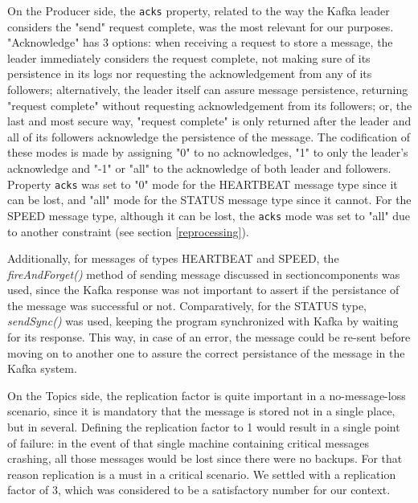 \documentclass[12pt]{article}
\begin{document}
On the Producer side, the \texttt{acks} property, related to the way the Kafka leader considers the "send" request complete, was the most relevant for our purposes. 
"Acknowledge" has 3 options: 
when receiving a request to store a message, the leader immediately considers the request complete, not making sure of its persistence in its logs nor requesting 
the acknowledgement from any of its followers; 
alternatively, the leader itself can assure message persistence, returning "request complete" without requesting acknowledgement from its followers; 
or, the last and most secure way, "request complete" is only returned after the leader and all of its followers acknowledge the persistence of the message. 
The codification of these modes is made by assigning "0" to no acknowledges, "1" to only the leader's acknowledge and "-1" or "all" to the acknowledge of both 
leader and followers. 
Property \texttt{acks} was set to "0" mode for the HEARTBEAT message type since it can be lost, and "all" mode for the STATUS message type since it cannot. 
For the SPEED message type, although it can be lost, the \texttt{acks} mode was set to "all" due to another constraint (see section \ref{reprocessing}).

Additionally, for messages of types HEARTBEAT and SPEED, the \textit{fireAndForget()} method of sending message discussed in section{components} was used, since 
the Kafka response was not important to assert if the persistance of the message was successful or not.
Comparatively, for the STATUS type, \textit{sendSync()} was used, keeping the program synchronized with Kafka by waiting for its response.
This way, in case of an error, the message could be re-sent before moving on to another one to assure the correct persistance of the message in the Kafka system.

On the Topics side, the replication factor is quite important in a no-message-loss scenario, since it is mandatory that the message is stored not in a single 
place, but in several.
Defining the replication factor to 1 would result in a single point of failure: in the event of that single machine containing critical messages crashing, all 
those messages would be lost since there were no backups. 
For that reason replication is a must in a critical scenario. 
We settled with a replication factor of 3, which was considered to be a satisfactory number for our context.
\end{document}
